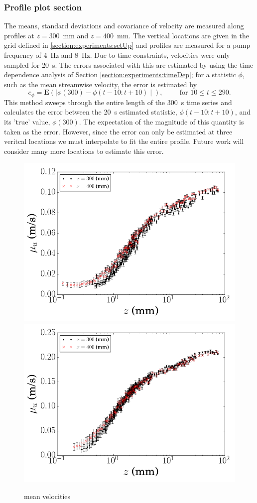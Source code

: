 \documentclass[12pt,oneside,a4paper]{article}
\begin{document}
\subsubsection{Profile plot section}
The means, standard deviations and covariance of velocity are measured along profiles at $z=$\SI{300}{mm} and $z=$\SI{400}{mm}. The vertical locations are given in the grid defined in \ref{section:experiments:setUp} and profiles are measured for a pump frequency of \SI{4}{Hz} and \SI{8}{Hz}. Due to time constraints, velocities were only sampled for \SI{20}{s}. The errors associated with this are estimated by using the time dependence analysis of Section \ref{section:experiments:timeDep}; for a statistic $\phi$, such as the mean streamwise velocity, the error is estimated by
\begin{equation}
e_\phi = \mathbf{E} \left( \mid
				\phi(300) - \phi(t-10:t+10)
					\mid \right), \hspace{1cm} \text{for } 10 \leq t \leq 290.
\end{equation}
This method sweeps through the entire length of the \SI{300}{s} time series and calculates the error between the \SI{20}{s} estimated statistic, $\phi(t-10:t+10)$, and its 'true' value, $\phi(300)$. The expectation of the magnitude of this quantity is taken as the error. However, since the error can only be estimated at three veritcal locations we must interpolate to fit the entire profile. Future work will consider many more locations to estimate this error. 

\begin{figure}[!h]
\centering
\includegraphics[width=0.5\linewidth]{images/LDA_profileImages/meanU_4hz.png}\hfill
\includegraphics[width=0.5\linewidth]{images/LDA_profileImages/meanU_8hz.png}
\caption{mean velocities}
\end{figure}
\end{document}
